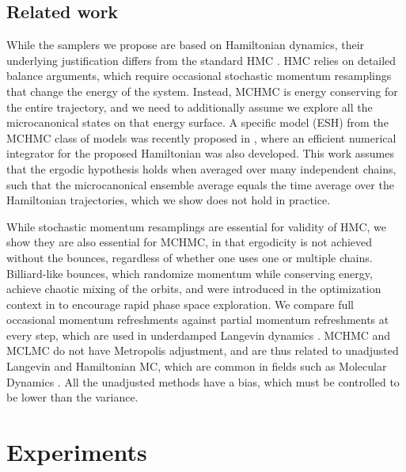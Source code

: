 \documentclass[twoside,11pt]{article}
\begin{document}
\subsection{Related work} 
While the samplers we propose are based on 
Hamiltonian dynamics, their underlying 
justification differs from the 
standard HMC \citep{HMCDuane,NealHandbook}. HMC relies on detailed balance arguments, which require occasional stochastic momentum resamplings that change
the energy of the system. Instead, MCHMC 
is energy conserving for the entire trajectory, and we need to additionally
assume we explore all the microcanonical 
states on that energy surface. 
A specific model (ESH) from the MCHMC class of models was recently proposed in \citet{ESH}, where an efficient numerical integrator for the proposed Hamiltonian was also developed.  This work assumes that the ergodic hypothesis holds when averaged over many independent chains, such that the microcanonical ensemble average equals the time average over the Hamiltonian trajectories, which we show 
does not hold in practice. 


While stochastic momentum 
resamplings are essential for validity of HMC, 
we show they are also essential for 
MCHMC, in that 
ergodicity is not achieved without 
the bounces, regardless of 
whether one uses one or multiple 
chains. Billiard-like bounces,
which randomize momentum while conserving energy,
achieve 
chaotic mixing of the orbits,  and were  introduced in the optimization context in \citet{BIoptimization} to encourage rapid phase space exploration. 
We compare full occasional momentum refreshments against
partial momentum refreshments at every step,
which are used in underdamped Langevin 
dynamics \citep{MolecularDynamics}. 
MCHMC and MCLMC do not have Metropolis
adjustment, and are thus related
to unadjusted Langevin and 
Hamiltonian MC, which are 
common in fields such as 
Molecular Dynamics \citep{MolecularDynamics}. All the
unadjusted
methods have a bias, which 
must be controlled to be lower
than the variance. 


\section{Experiments} \label{sec: results}
\end{document}
